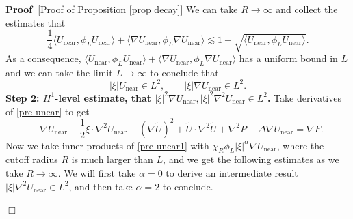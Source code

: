 \documentclass[11pt,a4paper]{article}
\numberwithin{equation}{section}
\newcommand{\cdummy}{\cdot}
\newcommand{\tmop}[1]{\ensuremath{\operatorname{#1}}}
\newenvironment{proof}{\noindent\textbf{Proof\ }}{\hspace*{\fill}$\Box$\medskip}
\begin{document}
\begin{proof}[Proof of Proposition \ref{prop decay}]
       We can take $R\to\infty$ and collect the estimates that \[\frac14\langle 
       U_{\tmop{near}},\phi_{L}U_{\tmop{near}}\rangle+\langle \nabla
       U_{\tmop{near}},\phi_{L}\nabla U_{\tmop{near}}\rangle\lesssim1+\sqrt{\langle 
       U_{\tmop{near}},\phi_{L}U_{\tmop{near}}\rangle}.\]
       As a consequence, $\langle 
       U_{\tmop{near}},\phi_{L}U_{\tmop{near}}\rangle+\langle \nabla
       U_{\tmop{near}},\phi_{L}\nabla U_{\tmop{near}}\rangle$ has a uniform bound in $L$ and we can take the limit $L \rightarrow \infty$ to conclude that  
       \begin{equation}
       \label{First-bound}
       |\xi|U_{\tmop{near}} \in L^2, \quad \quad|\xi|\nabla U_{\tmop{near}}\in L^2.
       \end{equation}
\smallskip
\noindent\textbf{Step 2: $H^1$-level estimate, that $|\xi|^2\nabla U_{\tmop{near}}, |\xi|^2\nabla^2 U_{\tmop{near}}\in L^2$.} Take derivatives of \eqref{pre unear} to get \begin{equation}
- \nabla U_{\tmop{near}} - \frac{1}{2} \xi \cdummy \nabla^2
       U_{\tmop{near}} + (\nabla\widetilde{U})^2+\widetilde{U} \cdot \nabla^2 \widetilde{U}+\nabla^2 P - \Delta
       \nabla U_{\tmop{near}} = \nabla F.
    \label{pre unear1}
\end{equation}
Now we take inner products of \eqref{pre unear1} with $\chi_R\phi_{L}|\xi|^\alpha\nabla U_{\tmop{near}}$, where the cutoff radius $R$ is much larger than $L$, and we get the following estimates as we take $R\to\infty$. We will first take $\alpha=0$ to derive an intermediate result $|\xi|\nabla^2 U_{\tmop{near}}\in L^2$, and then take $\alpha=2$ to conclude. 


\end{proof}
\end{document}
